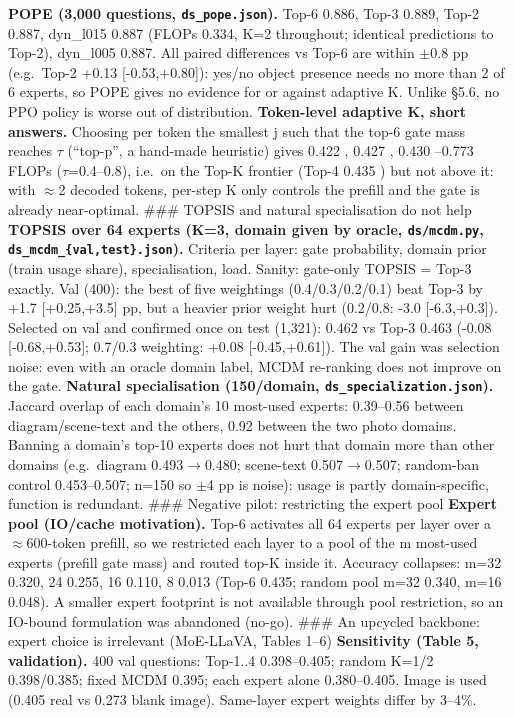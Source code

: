 \textbf{POPE (3,000 questions, \texttt{ds\_pope.json}).} Top-6 0.886, Top-3 0.889, Top-2 0.887, dyn\_l015 0.887 (FLOPs 0.334, K=2 throughout; identical predictions to Top-2), dyn\_l005 0.887. All paired differences vs Top-6 are within $\pm$0.8 pp (e.g.~Top-2 +0.13 {[}-0.53,+0.80{]}): yes/no object presence needs no more than 2 of 6 experts, so POPE gives no evidence for or against adaptive K. Unlike §5.6, no PPO policy is worse out of distribution.
\textbf{Token-level adaptive K, short answers.} Choosing per token the smallest j such that the top-6 gate mass reaches $\tau$ (``top-p'', a hand-made heuristic) gives 0.422 \citet{0.386}, 0.427 \citet{0.448}, 0.430 \citet{0.567}--0.773 FLOPs ($\tau$=0.4--0.8), i.e.~on the Top-K frontier (Top-4 0.435 \citet{0.667}) but not above it: with $\approx$2 decoded tokens, per-step K only controls the prefill and the gate is already near-optimal.
\#\#\# TOPSIS and natural specialisation do not help
\textbf{TOPSIS over 64 experts (K=3, domain given by oracle, \texttt{ds/mcdm.py}, \texttt{ds\_mcdm\_\{val,test\}.json}).} Criteria per layer: gate probability, domain prior (train usage share), specialisation, load. Sanity: gate-only TOPSIS = Top-3 exactly. Val (400): the best of five weightings (0.4/0.3/0.2/0.1) beat Top-3 by +1.7 {[}+0.25,+3.5{]} pp, but a heavier prior weight hurt (0.2/0.8: -3.0 {[}-6.3,+0.3{]}). Selected on val and confirmed once on test (1,321): 0.462 vs Top-3 0.463 (-0.08 {[}-0.68,+0.53{]}; 0.7/0.3 weighting: +0.08 {[}-0.45,+0.61{]}). The val gain was selection noise: even with an oracle domain label, MCDM re-ranking does not improve on the gate.
\textbf{Natural specialisation (150/domain, \texttt{ds\_specialization.json}).} Jaccard overlap of each domain's 10 most-used experts: 0.39--0.56 between diagram/scene-text and the others, 0.92 between the two photo domains. Banning a domain's top-10 experts does not hurt that domain more than other domains (e.g.~diagram 0.493$\rightarrow$0.480; scene-text 0.507$\rightarrow$0.507; random-ban control 0.453--0.507; n=150 so $\pm$4 pp is noise): usage is partly domain-specific, function is redundant.
\#\#\# Negative pilot: restricting the expert pool
\textbf{Expert pool (IO/cache motivation).} Top-6 activates all 64 experts per layer over a $\approx$600-token prefill, so we restricted each layer to a pool of the m most-used experts (prefill gate mass) and routed top-K inside it. Accuracy collapses: m=32 0.320, 24 0.255, 16 0.110, 8 0.013 (Top-6 0.435; random pool m=32 0.340, m=16 0.048). A smaller expert footprint is not available through pool restriction, so an IO-bound formulation was abandoned (no-go).
\#\#\# An upcycled backbone: expert choice is irrelevant (MoE-LLaVA, Tables 1--6)
\textbf{Sensitivity (Table 5, validation).}
400 val questions: Top-1..4 0.398--0.405; random K=1/2 0.398/0.385; fixed MCDM 0.395; each expert alone 0.380--0.405.
Image is used (0.405 real vs 0.273 blank image). Same-layer expert weights differ by 3--4\%.

